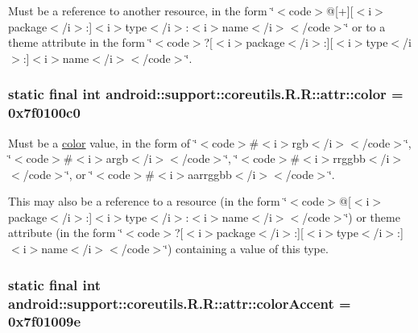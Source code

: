 Must be a reference to another resource, in the form \char`\"{}$<$code$>$@\mbox{[}+\mbox{]}\mbox{[}$<$i$>$package$<$/i$>$:\mbox{]}$<$i$>$type$<$/i$>$:$<$i$>$name$<$/i$>$$<$/code$>$\char`\"{} or to a theme attribute in the form \char`\"{}$<$code$>$?\mbox{[}$<$i$>$package$<$/i$>$:\mbox{]}\mbox{[}$<$i$>$type$<$/i$>$:\mbox{]}$<$i$>$name$<$/i$>$$<$/code$>$\char`\"{}. \hypertarget{classandroid_1_1support_1_1coreutils_1_1_r_1_1attr_8e83f6ebc369592781313701375343a4}{
\subsubsection[{color}]{\setlength{\rightskip}{0pt plus 5cm}static final int android::support::coreutils.R.R::attr::color = 0x7f0100c0}}
\label{classandroid_1_1support_1_1coreutils_1_1_r_1_1attr_8e83f6ebc369592781313701375343a4}


Must be a \hyperlink{classandroid_1_1support_1_1coreutils_1_1_r_1_1color}{color} value, in the form of \char`\"{}$<$code$>$\#$<$i$>$rgb$<$/i$>$$<$/code$>$\char`\"{}, \char`\"{}$<$code$>$\#$<$i$>$argb$<$/i$>$$<$/code$>$\char`\"{}, \char`\"{}$<$code$>$\#$<$i$>$rrggbb$<$/i$>$$<$/code$>$\char`\"{}, or \char`\"{}$<$code$>$\#$<$i$>$aarrggbb$<$/i$>$$<$/code$>$\char`\"{}. 

This may also be a reference to a resource (in the form \char`\"{}$<$code$>$@\mbox{[}$<$i$>$package$<$/i$>$:\mbox{]}$<$i$>$type$<$/i$>$:$<$i$>$name$<$/i$>$$<$/code$>$\char`\"{}) or theme attribute (in the form \char`\"{}$<$code$>$?\mbox{[}$<$i$>$package$<$/i$>$:\mbox{]}\mbox{[}$<$i$>$type$<$/i$>$:\mbox{]}$<$i$>$name$<$/i$>$$<$/code$>$\char`\"{}) containing a value of this type. \hypertarget{classandroid_1_1support_1_1coreutils_1_1_r_1_1attr_339aa6a0c2a142d37f49a753bb145362}{
\subsubsection[{colorAccent}]{\setlength{\rightskip}{0pt plus 5cm}static final int android::support::coreutils.R.R::attr::colorAccent = 0x7f01009e}}
\label{classandroid_1_1support_1_1coreutils_1_1_r_1_1attr_339aa6a0c2a142d37f49a753bb145362}


